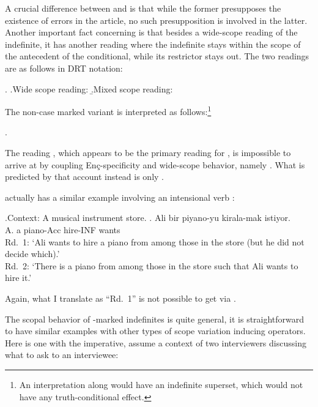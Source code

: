 \documentclass[11pt,a4paper]{article}
\newcommand{\encspec}{Enç-specific}
\begin{document}
A crucial difference between  and  is that while the
former presupposes the existence of errors in the article, no such
presupposition is involved in the latter. Another important fact concerning
 is that besides a wide-scope reading of the indefinite, it has
another reading where the indefinite stays within the scope of the antecedent
of the conditional, while its restrictor stays out. The two readings are as
follows in DRT notation:

\ex. 
\a.\label{condawide}Wide scope reading:
\b.\label{condanar}Mixed scope reading:


The non-case marked variant  is interpreted as follows:\footnote{An
interpretation along  would have an indefinite superset, which
would not have any truth-conditional effect.}

\ex. 


The reading , which appears to be the primary reading for
, is impossible to arrive at by coupling \encspec ity and
wide-scope behavior, namely . What is predicted by that
account instead is only .

 actually has a similar example involving an intensional verb
:

\ex.Context: A musical instrument store.
\ag. Ali bir piyano-yu kirala-mak istiyor.\\
A. a piano-Acc hire-INF wants\\
Rd.\ 1: `Ali wants to hire a piano from among those in the store (but he did not decide which).'\\
Rd.\ 2: `There is a piano from among those in the store such that Ali wants to hire it.'

Again, what I translate as ``Rd.\ 1'' is not possible to get via .

The scopal behavior of \acc-marked indefinites is quite general, it is
straightforward to have similar examples with other types of scope variation
inducing operators. Here is one with the imperative, assume a context of two
interviewers discussing what to ask to an interviewee:
\end{document}
